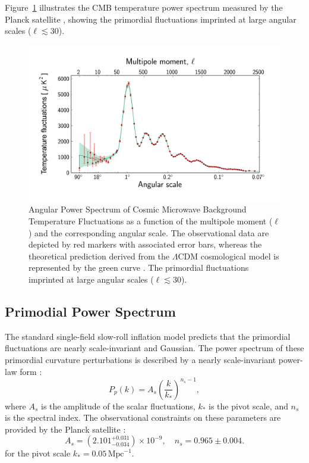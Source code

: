 Figure~\ref{fig:cmb_power_spectrum} illustrates the CMB temperature power spectrum measured by the Planck satellite \citep{2014A&A...571A..15P}, showing the primordial fluctuations imprinted at large angular scales (\( \ell \lesssim 30 \)).
\begin{figure}[ht]
    \centering
    \includegraphics[width=\textwidth]{figures/Planck_power_spectrum.jpg}
    \caption{Angular Power Spectrum of Cosmic Microwave Background Temperature Fluctuations as a function of the multipole moment (\( \ell \)) and the corresponding angular scale. The observational data are depicted by red markers with associated error bars, whereas the theoretical prediction derived from the \(\Lambda\)CDM cosmological model is represented by the green curve \citep{2014A&A...571A..15P}. The primordial fluctuations imprinted at large angular scales (\( \ell \lesssim 30 \)).
    }
    \label{fig:cmb_power_spectrum}
\end{figure}

\subsection{Primodial Power Spectrum}
The standard single-field slow-roll inflation model predicts that the primordial fluctuations are nearly scale-invariant and Gaussian. The power spectrum of these primordial curvature perturbations is described by a nearly scale-invariant power-law form \citep{2003moco.book.....D}:
\begin{equation}
    P_p(k) = A_s \left(\frac{k}{k_*}\right)^{n_s - 1},
\end{equation}
where $A_s$ is the amplitude of the scalar fluctuations, $k_*$ is the pivot scale, and $n_s$ is the spectral index. The observational constraints on these parameters are provided by the Planck satellite \citep{2020A&A...641A...6P}:
\begin{equation}
    A_s = (2.101^{+0.031}_{-0.034}) \times 10^{-9}, \quad n_s = 0.965 \pm 0.004.
\end{equation}
for the pivot scale \( k_* = 0.05 \, \text{Mpc}^{-1} \).

